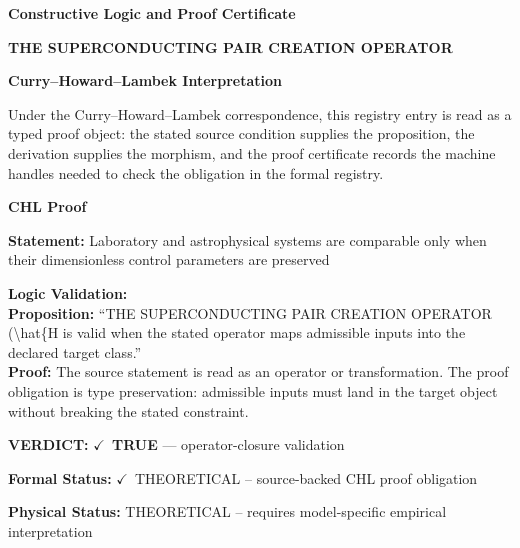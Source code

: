 \clearpage
\begingroup\tzpsupportsetup
\noindent\textbf{\fontsize{10.8pt}{12.8pt}\selectfont [ID 0594] Constructive Logic and Proof Certificate}\par
\noindent\textbf{\fontsize{10pt}{12pt}\selectfont THE SUPERCONDUCTING PAIR CREATION OPERATOR}\par
\vspace{0.45em}
\begingroup
\footnotesize
\setlength{\parskip}{0.22em}
\setlength{\parindent}{0pt}
\noindent\textbf{Curry--Howard--Lambek Interpretation}\par
Under the Curry--Howard--Lambek correspondence, this registry entry is read as a typed proof
object: the stated source condition supplies the proposition, the derivation supplies the
morphism, and the proof certificate records the machine handles needed to check the obligation
in the formal registry.

\vspace{0.45em}
\noindent\textbf{CHL Proof}\par
\textbf{Statement:} Laboratory and astrophysical systems are comparable only when their dimensionless
control parameters are preserved

\textbf{Logic Validation:}\\
\textbf{Proposition:} ``THE SUPERCONDUCTING PAIR CREATION OPERATOR (\textbackslash{}hat\{H is valid when the stated operator
maps admissible inputs into the declared target class.''\\
\textbf{Proof:} The source statement is read as an operator or transformation. The proof obligation is
type preservation: admissible inputs must land in the target object without breaking the
stated constraint.

\textbf{VERDICT:} \ensuremath{\checkmark}\ \textbf{TRUE} --- operator-closure validation

\textbf{Formal Status:} \ensuremath{\checkmark}\ THEORETICAL -- source-backed CHL proof obligation

\textbf{Physical Status:} THEORETICAL -- requires model-specific empirical interpretation
\par\vspace{0.45em}
\par
\ifTZPDarkEdition
{}
\fi
\endgroup
\endgroup

